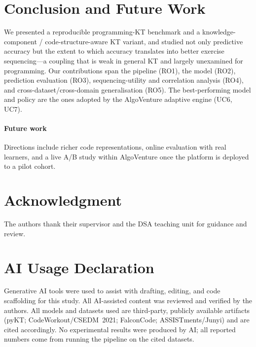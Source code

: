 \section{Conclusion and Future Work}
\label{sec:conclusion}

We presented a reproducible programming-KT benchmark and a
knowledge-component / code-structure-aware KT variant, and studied not
only predictive accuracy but the extent to which accuracy translates into
better exercise sequencing---a coupling that is weak in general KT and
largely unexamined for programming. Our contributions span the pipeline
(RO1), the model (RO2), prediction evaluation (RO3), sequencing-utility
and correlation analysis (RO4), and cross-dataset/cross-domain
generalisation (RO5). The best-performing model and policy are the ones
adopted by the AlgoVenture adaptive engine (UC6, UC7).

\paragraph{Future work}
Directions include richer code representations, online evaluation with
real learners, and a live A/B study within AlgoVenture once the platform
is deployed to a pilot cohort.

\section*{Acknowledgment}
The authors thank their supervisor and the DSA teaching unit for guidance
and review.

\section*{AI Usage Declaration}
Generative AI tools were used to assist with drafting, editing, and code
scaffolding for this study. All AI-assisted content was reviewed and
verified by the authors. All models and datasets used are third-party,
publicly available artifacts (pyKT; CodeWorkout/CSEDM~2021; FalconCode;
ASSISTments/Junyi) and are cited accordingly. No experimental results
were produced by AI; all reported numbers come from running the
pipeline on the cited datasets.
